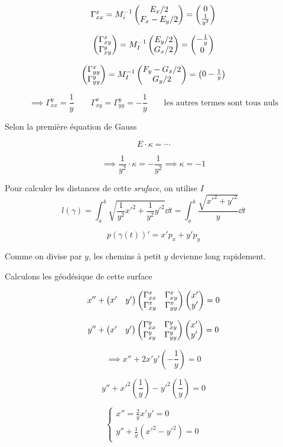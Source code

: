 $$\Gamma_{xx}^x = M_i^{-1} \begin{pmatrix} E_{x}/2 \\ F_x - E_y /2 \end{pmatrix} = \begin{pmatrix} 0\\ \frac{1}{y^2}  \end{pmatrix}$$ 

$$\begin{pmatrix} \Gamma_{xy}^x \\ \Gamma_{xy}^y \end{pmatrix} = M_I^{-1}\begin{pmatrix} E_{y}/2 \\ G_x /2 \end{pmatrix} = \begin{pmatrix} -\frac{1}{y} \\0 \end{pmatrix}$$ 

$$\begin{pmatrix} \Gamma_{yy}^x \\ \Gamma_{yy}^y \end{pmatrix} = M_I^{-1} \begin{pmatrix} F_y - G_x /2 \\ G_y /2 \end{pmatrix} = \begin{pmatrix} 0 - \frac{1}{y}  \end{pmatrix}$$ 

$$\implies \Gamma_{xx}^y = \frac{1}{y} \qquad \Gamma_{xy}^x = \Gamma_{yy}^y = - \frac{1}{y} \qquad \text{les autres termes sont tous nuls} $$

Selon la première équation de Gauss

$$E \cdot \kappa = \dotsb$$ 

$$\implies \frac{1}{y^2} \cdot \kappa = - \frac{1}{y^2} \implies \kappa = -1$$ 


Pour calculer les distances de cette \textit{sruface}, on utilise $I$ $$l(\gamma) = \int_a^b \sqrt{\frac{1}{y^2} x'^2 + \frac{1}{y^2} y'^2} \dd t = \int_a^b \frac{\sqrt{x'^2+y'^2}}{y} \dd t$$   

$$\boxed{p(\gamma(t))' = x'p_x + y' p_y}$$

Comme on divise par $y$, les chemins à petit $y$ devienne long rapidement.

Calculons les géodésique de cette surface

$$x'' + \begin{pmatrix} x' & y' \end{pmatrix} \begin{pmatrix} \Gamma_{xx}^x & \Gamma_{xy}^x \\ \Gamma_{xy}^x & \Gamma_{yy}^x  \end{pmatrix}  \begin{pmatrix} x'\\ y' \end{pmatrix} = 0$$ 

$$y'' + \begin{pmatrix} x' & y' \end{pmatrix} \begin{pmatrix} \Gamma_{xx}^y & \Gamma_{xy}^y \\ \Gamma_{xy}^y & \Gamma_{yy}^y  \end{pmatrix}  \begin{pmatrix} x'\\ y' \end{pmatrix} = 0$$ 

$$\implies x'' + 2x'y' \left( - \frac{1}{y}  \right)  =0$$ 

$$y'' + x'^2 \left( \frac{1}{y}  \right) -y'^2 \left( \frac{1}{y}  \right) =0$$ 


\begin{equation}
	\begin{cases}
	x'' = \frac{2}{y} x'y' =0 \tag{1, 2}\\
	y'' + \frac{1}{y} \left( x'^2 - y'^2 \right) =0
\end{cases}
\end{equation} 

